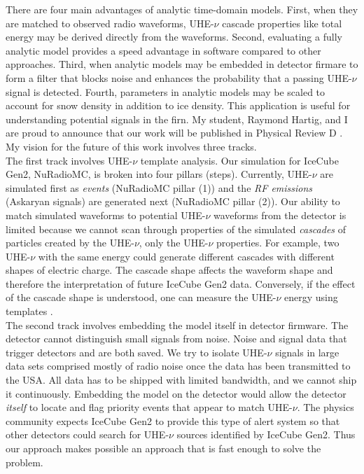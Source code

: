 \documentclass[../../../main.tex]{subfiles}
\begin{document}
There are four main advantages of analytic time-domain models. First, when they are matched to observed radio waveforms, UHE-$\nu$ cascade properties like total energy may be derived directly from the waveforms. Second, evaluating a fully analytic model provides a speed advantage in software compared to other approaches.  Third, when analytic models may be embedded in detector firmare to form a filter that blocks noise and enhances the probability that a passing UHE-$\nu$ signal is detected.  Fourth, parameters in analytic models may be scaled to account for snow density in addition to ice density.  This application is useful for understanding potential signals in the firn.  My student, Raymond Hartig, and I are proud to announce that our work will be published in Physical Review D \cite{time}.  My vision for the future of this work involves three tracks.
\\
\vspace{0.15cm}
The first track involves UHE-$\nu$ template analysis.  Our simulation for IceCube Gen2, NuRadioMC, is broken into four pillars (steps).  Currently, UHE-$\nu$ are simulated first as \textit{events} (NuRadioMC pillar (1)) and the \textit{RF emissions} (Askaryan signals) are generated next (NuRadioMC pillar (2)).  Our ability to match simulated waveforms to potential UHE-$\nu$ waveforms from the detector is limited because we cannot scan through properties of the simulated \textit{cascades} of particles created by the UHE-$\nu$, only the UHE-$\nu$ properties.  For example, two UHE-$\nu$ with the same energy could generate different cascades with different shapes of electric charge.  The cascade shape affects the waveform shape and therefore the interpretation of future IceCube Gen2 data.  Conversely, if the effect of the cascade shape is understood, one can measure the UHE-$\nu$ energy using templates \cite{time}.
\\
\vspace{0.15cm}
The second track involves embedding the model itself in detector firmware.  The detector cannot distinguish small signals from noise.  Noise and signal data that trigger detectors and are both saved.  We try to isolate UHE-$\nu$ signals in large data sets comprised mostly of radio noise once the data has been transmitted to the USA.  All data has to be shipped with limited bandwidth, and we cannot ship it continuously.  Embedding the model on the detector would allow the detector \textit{itself} to locate and flag priority events that appear to match UHE-$\nu$.  The physics community expects IceCube Gen2 to provide this type of alert system so that other detectors could search for UHE-$\nu$ sources identified by IceCube Gen2.  Thus our approach makes possible an approach that is fast enough to solve the problem.
\end{document}
